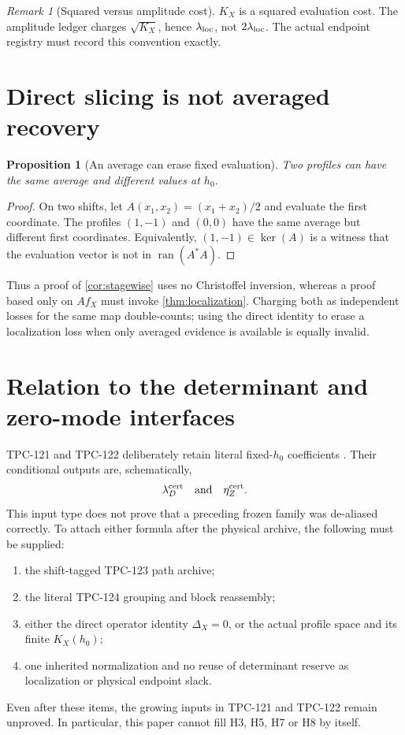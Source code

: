 \documentclass[11pt]{article}
\newtheorem{proposition}[theorem]{Proposition}
\theoremstyle{definition}
\theoremstyle{remark}
\newtheorem{remark}[theorem]{Remark}
\newcommand{\Ran}{\operatorname{ran}}
\newcommand{\Ker}{\operatorname{ker}}
\begin{document}
\begin{remark}[Squared versus amplitude cost]
\(K_X\) is a squared evaluation cost.  The amplitude ledger charges
\(\sqrt{K_X}\), hence \(\lambda_{\rm loc}\), not
\(2\lambda_{\rm loc}\).  The actual endpoint registry must record
this convention exactly.
\end{remark}

\section{Direct slicing is not averaged recovery}

\begin{proposition}[An average can erase fixed evaluation]
\label{prop:average}
Two profiles can have the same average and different values at
\(h_0\).
\end{proposition}

\begin{proof}
On two shifts, let \(A(x_1,x_2)=(x_1+x_2)/2\) and evaluate the first
coordinate.  The profiles \((1,-1)\) and \((0,0)\) have the same
average but different first coordinates.  Equivalently,
\((1,-1)\in\Ker(A)\) is a witness that the evaluation vector is not
in \(\Ran(A^*A)\).
\end{proof}

Thus a proof of \cref{cor:stagewise} uses no Christoffel inversion,
whereas a proof based only on \(A f_X\) must invoke
\cref{thm:localization}.  Charging both as independent losses for the
same map double-counts; using the direct identity to erase a
localization loss when only averaged evidence is available is equally
invalid.

\section{Relation to the determinant and zero-mode interfaces}

TPC-121 and TPC-122 deliberately retain literal fixed-\(h_0\)
coefficients \citep{WangTPC121,WangTPC122}.  Their conditional
outputs are, schematically,
\[
 \lambda_D^{\rm cert}
 \quad\text{and}\quad
 \eta_Z^{\rm cert}.
\]
This input type does not prove that a preceding frozen family was
de-aliased correctly.  To attach either formula after the physical
archive, the following must be supplied:
\begin{enumerate}[label=\textbf{I\arabic*.},leftmargin=2.7em]
\item the shift-tagged TPC-123 path archive;
\item the literal TPC-124 grouping and block reassembly;
\item either the direct operator identity \(\Delta_X=0\), or the
actual profile space and its finite \(K_X(h_0)\);
\item one inherited normalization and no reuse of determinant reserve
as localization or physical endpoint slack.
\end{enumerate}
Even after these items, the growing inputs in TPC-121 and TPC-122
remain unproved.  In particular, this paper cannot fill H3, H5, H7 or
H8 by itself.
\end{document}
